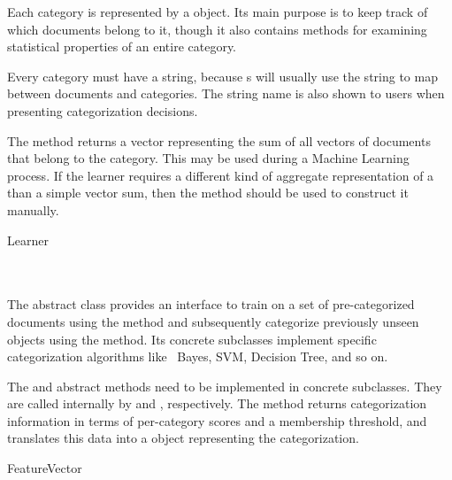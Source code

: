 \begin{description}
Each category is represented by a  object.  Its main purpose
is to keep track of which documents belong to it, though it also
contains methods for examining statistical properties of an entire
category.

Every category must have a  string, because
s will usually use the string to map between
documents and categories.  The string name is also shown to users when
presenting categorization decisions.

The  method returns a vector representing the sum of
all vectors of documents that belong to the category.  This may be
used during a Machine Learning process.  If the learner requires a
different kind of aggregate representation of a  than
a simple vector sum, then the  method should be used
to construct it manually.

\item
\begin{abstractclass}{Learner}
 \attributes
 \methods
   \\
   \\
   \\
\end{abstractclass}

The abstract  class provides an interface to train on a
set of pre-categorized documents using the  method and
subsequently categorize previously unseen  objects
using the  method.  Its
concrete subclasses implement specific categorization algorithms like
\naive\ Bayes, SVM, Decision Tree, and so on.

The  and  abstract methods
need to be implemented in concrete  subclasses.  They
are called internally by  and ,
respectively.  The  method returns categorization
information in terms of per-category scores and a membership
threshold, and  translates this data into a
 object representing the categorization.

\item
\begin{concreteclass}{FeatureVector}
 \attributes
 \methods
   \\
   \\
   \\
\end{concreteclass}


\end{description}
